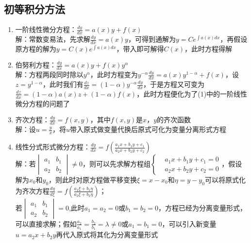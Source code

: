 \documentclass[12pt,a4paper,UTF8]{book}
\begin{document}
\subsection{初等积分方法}
\begin{enumerate}
\item 一阶线性微分方程：$\frac{dy}{dx}=a\left(x\right)y+f\left(x\right)$\\
解：常数变易法，先求解$\frac{dy}{dx}=a\left(x\right)y$，可得到通解为$y=Ce^{\int{a\left(x\right)dx}}$，再假设原方程的解为$y=C\left(x\right)e^{\int{a\left(x\right)dx}}$，带入即可解得$C\left(x\right)$，此时方程得解
\item 伯努利方程：$\frac{dy}{dx}=a\left(x\right)y+f\left(x\right)y^{\alpha}$\\
解：方程两段同时除以$y^{\alpha}$，此时方程变为$y^{-\alpha}\frac{dy}{dx}=a\left(x\right)y^{1-\alpha}+f\left(x\right)$，设$z=y^{1-\alpha}$，此时我们有$\frac{dz}{dx}=\left(1-\alpha\right)y^{-\alpha}\frac{dy}{dx}$，于是方程又可变为$\frac{dz}{dx}=\left(1-\alpha\right)a\left(x\right)z+\left(1-\alpha\right)f\left(x\right)$，此时方程便化为了(1)中的一阶线性微分方程的问题了
\item 齐次方程：$\frac{dy}{dx}=f\left(x,y\right)$，其中$f\left(x,y\right)$是$x$，$y$的齐次函数\\
解：设$u=\frac{y}{x}$，将$u$带入原式做变量代换后原式可化为变量分离形式方程
\item 线性分式形式微分方程：$\frac{dy}{dx}=f\left(\frac{a_1x+b_1y+c_1}{a_2x+b_2y+c_2}\right)$\\
解：若$\begin{vmatrix}a_1&b_1\\a_2&b_2\end{vmatrix}\ne0$，则可以先求解方程组$\left\{\begin{aligned}&a_1x+b_1y+c_1=0\\&a_2x+b_2y+c_2=0\end{aligned}\right.$，假设解为$x_0$和$y_0$，则此时对原方程做平移变换$\xi=x-x_0$和$\eta=y-y_0$可以将原式化为齐次方程$\frac{d\eta}{d\xi}=f\left(\frac{a_1\xi+b_1\eta}{a_2\xi+b_2\eta}\right)$；\\
若$\begin{vmatrix}a_1&b_1\\a_2&b_2\end{vmatrix}=0$,此时$a_1=a_2=0$或$b_1=b_2=0$，方程已经为分离变量形式，可以直接求解；假如$\frac{a_2}{a_1}=\frac{b_2}{b_1}=\lambda\ne0$或$a_1=b_1=0$，可以引入新变量$u=a_2x+b_2y$再代入原式将其化为分离变量形式
\end{enumerate}
\end{document}

